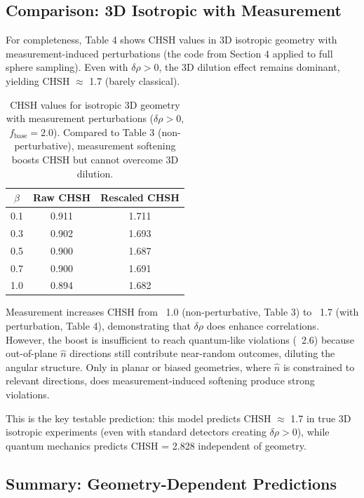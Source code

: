 \subsection*{Comparison: 3D Isotropic with Measurement}

For completeness, Table 4 shows CHSH values in 3D isotropic geometry with measurement-induced perturbations (the code from Section 4 applied to full sphere sampling). Even with $\delta\rho > 0$, the 3D dilution effect remains dominant, yielding CHSH $\approx$ 1.7 (barely classical).

\begin{table}[h]
\centering
\caption{CHSH values for isotropic 3D geometry with measurement perturbations ($\delta\rho > 0$, $f_{\mathrm{base}}=2.0$). Compared to Table 3 (non-perturbative), measurement softening boosts CHSH but cannot overcome 3D dilution.}
\label{P8:tab:isotropic_measured_chsh}
\begin{tabular}{c|c|c}
\hline
$\beta$ & Raw CHSH & Rescaled CHSH \\
\hline
0.1 & 0.911 & 1.711 \\
0.3 & 0.902 & 1.693 \\
0.5 & 0.900 & 1.687 \\
0.7 & 0.900 & 1.691 \\
1.0 & 0.894 & 1.682 \\
\hline
\end{tabular}
\end{table}

Measurement increases CHSH from ~1.0 (non-perturbative, Table 3) to ~1.7 (with perturbation, Table 4), demonstrating that $\delta\rho$ does enhance correlations. However, the boost is insufficient to reach quantum-like violations (~2.6) because out-of-plane $\hat{n}$ directions still contribute near-random outcomes, diluting the angular structure. Only in planar or biased geometries, where $\hat{n}$ is constrained to relevant directions, does measurement-induced softening produce strong violations.

This is the key testable prediction: this model predicts CHSH $\approx$ 1.7 in true 3D isotropic experiments (even with standard detectors creating $\delta\rho > 0$), while quantum mechanics predicts CHSH = 2.828 independent of geometry.

\subsection*{Summary: Geometry-Dependent Predictions}

